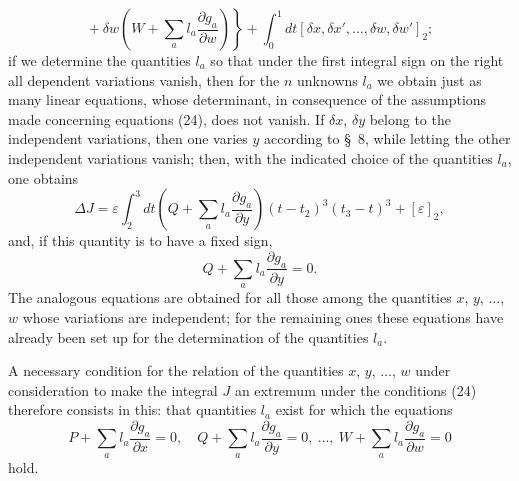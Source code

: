 \documentclass[11pt,a4paper,leqno]{article}
\begin{document}
\[
\left.{}+\delta w\left(W+\sum_a l_a\frac{\partial g_a}{\partial w}\right)\right\}+\int_0^1dt[\delta x,\delta x',\ldots,\delta w,\delta w']_2;
\]
if we determine the quantities $l_a$ so that under the first integral sign on the right all dependent variations vanish, then for the $n$ unknowns $l_a$ we obtain just as many linear equations, whose determinant, in consequence of the assumptions made concerning equations (24), does not vanish. If $\delta x$, $\delta y$ belong to the independent variations, then one varies $y$ according to \S~8, while letting the other independent variations vanish; then, with the indicated choice of the quantities $l_a$, one obtains
\[
\Delta J=\varepsilon\int_2^3 dt\left(Q+\sum_a l_a\frac{\partial g_a}{\partial y}\right)(t-t_2)^3(t_3-t)^3+[\varepsilon]_2,
\]
and, if this quantity is to have a fixed sign,
\[
Q+\sum_a l_a\frac{\partial g_a}{\partial y}=0.
\]
The analogous equations are obtained for all those among the quantities $x$, $y$, $\ldots$, $w$ whose variations are independent; for the remaining ones these equations have already been set up for the determination of the quantities $l_a$.

A necessary condition for the relation of the quantities $x$, $y$, $\ldots$, $w$ under consideration to make the integral $J$ an extremum under the conditions (24) therefore consists in this: that quantities $l_a$ exist for which the equations
\[
P+\sum_a l_a\frac{\partial g_a}{\partial x}=0,\quad Q+\sum_a l_a\frac{\partial g_a}{\partial y}=0,\ \ldots,\ W+\sum_a l_a\frac{\partial g_a}{\partial w}=0
\]
hold.
\end{document}
